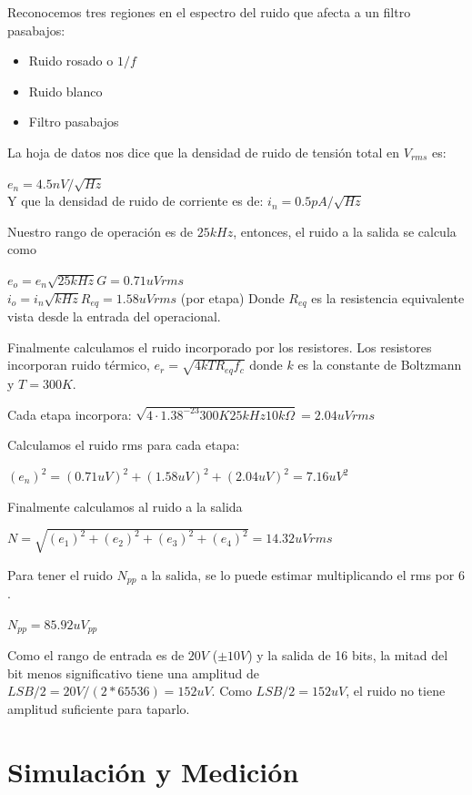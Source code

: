 \documentclass[12pt,a4paper]{article}
\begin{document}
Reconocemos tres regiones en el espectro del ruido que afecta a un filtro pasabajos:

\begin{itemize}

\item Ruido rosado o $1/f$
\item Ruido blanco
\item Filtro pasabajos

\end{itemize}

La hoja de datos nos dice que la densidad de ruido de tensión total en $V_{rms}$ es:

$e_n = 4.5nV/\sqrt{Hz}$\\
Y que la densidad de ruido de corriente es de:
$i_n = 0.5pA/\sqrt{Hz}$

Nuestro rango de operación es de $25kHz$, entonces, el ruido a la salida se calcula como 

$e_o = e_n  \sqrt{25kHz}  G = 0.71uV rms$\\
$i_o = i_n \sqrt{kHz} R_{eq} = 1.58uV rms$ (por etapa)
Donde $R_{eq}$ es la resistencia equivalente vista desde la entrada del operacional.

Finalmente calculamos el ruido incorporado por los resistores. Los resistores incorporan ruido térmico, $e_r = \sqrt{ 4 k  T  R_{eq} f_c}$
donde $k$ es la constante de Boltzmann y $T=300K$.

Cada etapa incorpora: 
$\sqrt {4\cdot1.38^{-23} 300K 25kHz 10k\Omega } = 2.04uV rms$

Calculamos el ruido rms para cada etapa:

$(e_n) ^ 2 = (0.71uV)^2 +  (1.58uV) ^2 + (2.04uV)^2 = 7.16 uV^2$

Finalmente calculamos al ruido a la salida 

$N = \sqrt { (e_1)^2 + (e_2)^2 + (e_3)^2 + (e_4)^2 } = 14.32uV rms $

Para tener el ruido $N_{pp}$ a la salida, se lo puede estimar multiplicando el rms por $6$.

$N_{pp} = 85.92uV_{pp}$

Como el rango de entrada es de $20V$ ($\pm 10V$) y la salida de 16 bits, la mitad del bit menos significativo tiene una amplitud de $LSB/2 = 20V/(2*65536) = 152uV$\cite{LSB}. Como $LSB/2 = 152uV$, el ruido no tiene amplitud suficiente para taparlo.

\section{\textbf{Simulación y Medición}}
\end{document}
